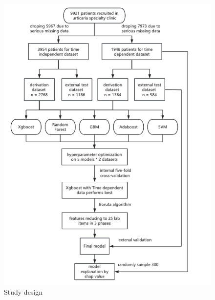 \documentclass[final,3p,times,authoryear]{elsarticle}
\begin{document}
\begin{figure}[t]
    \centering
    \includegraphics[width=\textwidth]{figures/protocol.png}
    \caption{Study design}\label{protocol}
\end{figure}
\end{document}
